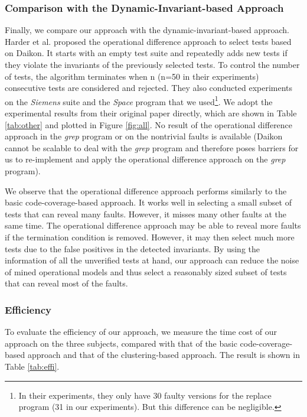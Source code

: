 \documentclass{sig-alternate}
\begin{document}
\subsubsection{Comparison with the Dynamic-Invariant-based Approach}

Finally, we compare our approach with the dynamic-invariant-based
approach. Harder et al. \cite{Harder03} proposed the operational
difference approach to select tests based on Daikon. It starts with
an empty test suite and repeatedly adds new tests if they violate
the invariants of the previously selected tests. To control the
number of tests, the algorithm terminates when n (n=50 in their
experiments) consecutive tests are considered and rejected. They
also conducted experiments on the \emph{Siemens} suite and the
\emph{Space} program that we used\footnote{In their experiments,
they only have 30 faulty versions for the replace program (31 in our
experiments). But this difference can be negligible.}. We adopt the
experimental results from their original paper directly, which are
shown in Table \ref{tab:other} and plotted in Figure \ref{fig:all}.
No result of the operational difference approach in the \emph{grep}
program or on the nontrivial faults is available (Daikon cannot be
scalable to deal with the \emph{grep} program and therefore poses
barriers for us to re-implement and apply the operational difference
approach on the \emph{grep} program).



We observe that the operational difference approach performs
similarly to the basic code-coverage-based approach. It works well
in selecting a small subset of tests that can reveal many faults.
However, it misses many other faults at the same time. The
operational difference approach may be able to reveal more faults if
the termination condition is removed. However, it may then select
much more tests due to the false positives in the detected
invariants. By using the information of all the unverified tests at
hand, our approach can reduce the noise of mined operational models
and thus select a reasonably sized subset of tests that can reveal
most of the faults.





\subsubsection{Efficiency}



To evaluate the efficiency of our approach, we measure the time cost
of our approach on the three subjects, compared with that of the
basic code-coverage-based approach and that of the clustering-based
approach. The result is shown in Table \ref{tab:effi}.
\end{document}
